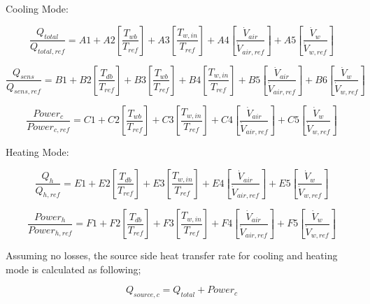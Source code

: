 Cooling Mode:

\begin{equation}
\frac{{{Q_{total}}}}{{{Q_{total,ref}}}} = A1 + A2\left[ {\frac{{{T_{wb}}}}{{{T_{ref}}}}} \right] + A3\left[ {\frac{{{T_{w,in}}}}{{{T_{ref}}}}} \right] + A4\left[ {\frac{{{{\dot V}_{air}}}}{{{{\dot V}_{air,ref}}}}} \right] + A5\left[ {\frac{{{{\dot V}_w}}}{{{{\dot V}_{w,ref}}}}} \right]
\end{equation}

\begin{equation}
\frac{{{Q_{sens}}}}{{{Q_{sens,ref}}}} = B1 + B2\left[ {\frac{{{T_{db}}}}{{{T_{ref}}}}} \right] + B3\left[ {\frac{{{T_{wb}}}}{{{T_{ref}}}}} \right] + B4\left[ {\frac{{{T_{w,in}}}}{{{T_{ref}}}}} \right] + B5\left[ {\frac{{{{\dot V}_{air}}}}{{{{\dot V}_{air,ref}}}}} \right] + B6\left[ {\frac{{{{\dot V}_w}}}{{{{\dot V}_{w,ref}}}}} \right]
\end{equation}

\begin{equation}
\frac{{Powe{r_c}}}{{Powe{r_{c,ref}}}} = C1 + C2\left[ {\frac{{{T_{wb}}}}{{{T_{ref}}}}} \right] + C3\left[ {\frac{{{T_{w,in}}}}{{{T_{ref}}}}} \right] + C4\left[ {\frac{{{{\dot V}_{air}}}}{{{{\dot V}_{air,ref}}}}} \right] + C5\left[ {\frac{{{{\dot V}_w}}}{{{{\dot V}_{w,ref}}}}} \right]
\end{equation}

Heating Mode:

\begin{equation}
\frac{{{Q_h}}}{{{Q_{h,ref}}}} = E1 + E2\left[ {\frac{{{T_{db}}}}{{{T_{ref}}}}} \right] + E3\left[ {\frac{{{T_{w,in}}}}{{{T_{ref}}}}} \right] + E4\left[ {\frac{{{{\dot V}_{air}}}}{{{{\dot V}_{air,ref}}}}} \right] + E5\left[ {\frac{{{{\dot V}_w}}}{{{{\dot V}_{w,ref}}}}} \right]
\end{equation}

\begin{equation}
\frac{{Powe{r_h}}}{{Powe{r_{h,ref}}}} = F1 + F2\left[ {\frac{{{T_{db}}}}{{{T_{ref}}}}} \right] + F3\left[ {\frac{{{T_{w,in}}}}{{{T_{ref}}}}} \right] + F4\left[ {\frac{{{{\dot V}_{air}}}}{{{{\dot V}_{air,ref}}}}} \right] + F5\left[ {\frac{{{{\dot V}_w}}}{{{{\dot V}_{w,ref}}}}} \right]
\end{equation}

Assuming no losses, the source side heat transfer rate for cooling and heating mode is calculated as following;

\begin{equation}
{Q_{source,c}} = {Q_{total}} + Powe{r_c}
\end{equation}

